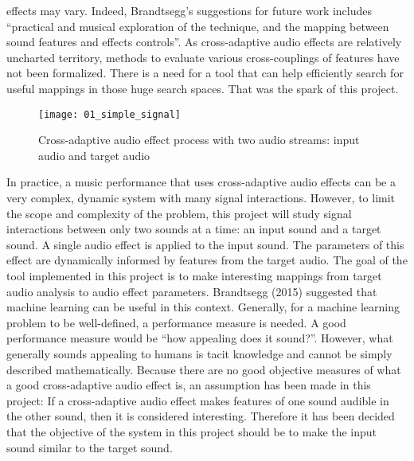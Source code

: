 effects may vary. Indeed, Brandtsegg’s suggestions for future work includes “practical and musical exploration of the technique, and the mapping between sound features and effects controls”. As cross-adaptive audio effects are relatively uncharted territory, methods to evaluate various cross-couplings of features have not been formalized. There is a need for a tool that can help efficiently search for useful mappings in those huge search spaces. That was the spark of this project.

\begin{figure}[h]
    \centering
    \texttt{[image: 01\_simple\_signal]}
    \caption{Cross-adaptive audio effect process with two audio streams: input audio and target audio}
    \label{fig:simple_signal}
\end{figure}

In practice, a music performance that uses cross-adaptive audio effects can be a very complex, dynamic system with many signal interactions. However, to limit the scope and complexity of the problem, this project will study signal interactions between only two sounds at a time: an input sound and a target sound. A single audio effect is applied to the input sound. The parameters of this effect are dynamically informed by features from the target audio. The goal of the tool implemented in this project is to make interesting mappings from target audio analysis to audio effect parameters. Brandtsegg (2015) suggested that machine learning can be useful in this context. Generally, for a machine learning problem to be well-defined, a performance measure is needed. A good performance measure would be “how appealing does it sound?”. However, what generally sounds appealing to humans is tacit knowledge and cannot be simply described mathematically. Because there are no good objective measures of what a good cross-adaptive audio effect is, an assumption has been made in this project: If a cross-adaptive audio effect makes features of one sound audible in the other sound, then it is considered interesting. Therefore it has been decided that the objective of the system in this project should be to make the input sound similar to the target sound.

